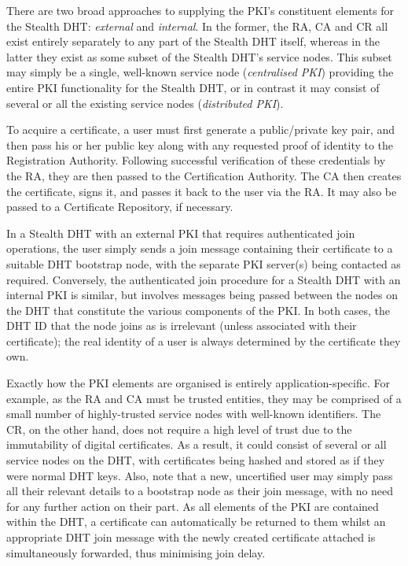 \documentclass[times, 10pt,twocolumn]{article}
\begin{document}
\label{subsect-joinandauth}

There are two broad approaches to supplying the PKI's constituent
elements for the Stealth DHT: \emph{external} and \emph{internal}. In
the former, the RA, CA and CR all exist entirely separately to any part
of the Stealth DHT itself, whereas in the latter they exist as some
subset of the Stealth DHT's service nodes. This subset may simply be a
single, well-known service node (\emph{centralised PKI}) providing the
entire PKI functionality for the Stealth DHT, or in contrast it may
consist of several or all the existing service nodes (\emph{distributed
PKI}).

To acquire a certificate, a user must first generate a public/private
key pair, and then pass his or her public key along with any requested
proof of identity to the Registration Authority. Following successful
verification of these credentials by the RA, they are then passed to
the Certification Authority. The CA then creates the certificate, signs
it, and passes it back to the user via the RA. It may also be passed to
a Certificate Repository, if necessary.

In a Stealth DHT with an external PKI that requires authenticated join
operations, the user simply sends a join message containing their
certificate to a suitable DHT bootstrap node, with the separate PKI
server(s) being contacted as required. Conversely, the authenticated
join procedure for a Stealth DHT with an internal PKI is similar, but
involves messages being passed between the nodes on the DHT that
constitute the various components of the PKI. In both cases, the DHT ID
that the node joins as is irrelevant (unless associated with their
certificate); the real identity of a user is always determined by the
certificate they own.

Exactly how the PKI elements are organised is entirely
application-specific. For example, as the RA and CA must be trusted
entities, they may be comprised of a small number of highly-trusted
service nodes with well-known identifiers. The CR, on the other hand,
does not require a high level of trust due to the immutability of
digital certificates. As a result, it could consist of several or all
service nodes on the DHT, with certificates being hashed and stored as
if they were normal DHT keys. Also, note that a new, uncertified user
may simply pass all their relevant details to a bootstrap node as their
join message, with no need for any further action on their part. As all
elements of the PKI are contained within the DHT, a certificate can
automatically be returned to them whilst an appropriate DHT join
message with the newly created certificate attached is simultaneously
forwarded, thus minimising join delay.
\end{document}
